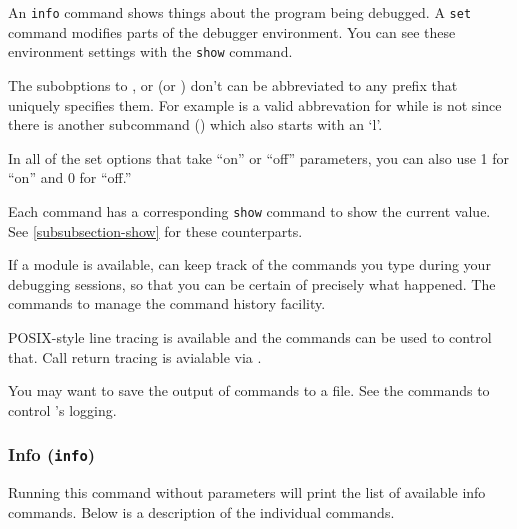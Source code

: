 An {\tt info} command shows things about the program being debugged. A
{\tt set} command modifies parts of the debugger environment. You can
see these environment settings with the {\tt show} command.

The subobptions to , or  (or ) don't
can be abbreviated to any prefix that uniquely specifies them. For
example  is a valid abbrevation for 
while  is not since there is another subcommand
() which also starts with an `l'.

In all of the set options that take ``on'' or ``off'' parameters, you
can also use 1 for ``on'' and 0 for ``off.''

Each command has a corresponding {\tt show} command to show the current
value. See \ref{subsubsection-show} for these counterparts.

If a
module is available,  can keep track of the commands you
type during your debugging sessions, so that you can be certain of
precisely what happened.  The  commands to manage
the command history facility.

POSIX-style line tracing is available and the 
commands can be used to control that. Call return tracing is avialable
via .

You may want to save the output of  commands to a file.
See the  commands to control 's logging.

\subsubsection{Info ({\tt info})\label{subsubsection-info}}

Running this command without parameters will print the list of
available info commands. Below is a description of the individual
commands.

